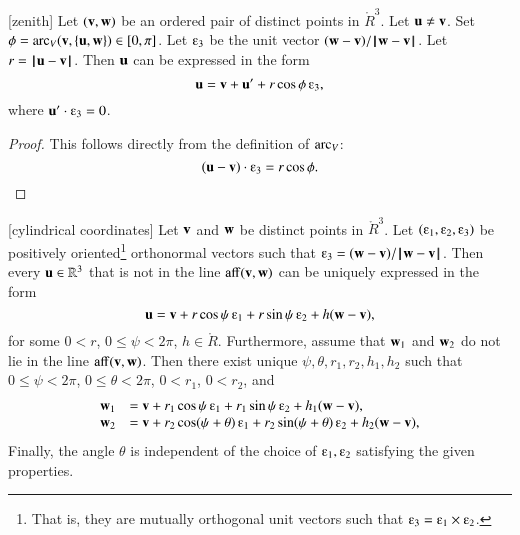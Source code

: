 \begin{lemma}[zenith]
Let $({\mathbf v},{\mathbf w})$ be an ordered pair of distinct points in $\ring{R}^3$.
Let ${\mathbf u}\ne {\mathbf v}$.  Set $\phi = \operatorname{arc}_V({\mathbf v},\{{\mathbf u},{\mathbf w}\})\in[0,\pi]$.
Let $\e_3$ be the unit vector $({\mathbf w}-{\mathbf v})/{\hskip0.1em|\hskip-0.15em|\hskip0.1em}{\mathbf w} - {\mathbf v}{\hskip0.1em|\hskip-0.15em|\hskip0.1em}$.  Let $r = {\hskip0.1em|\hskip-0.15em|\hskip0.1em}{\mathbf u} - {\mathbf v}{\hskip0.1em|\hskip-0.15em|\hskip0.1em}$.
Then ${\mathbf u}$
can be expressed in the form
   $$
   \u = \v + \u' +
   r\cos\phi\, \e_3,
   $$
where $\u'\cdot \e_3 = 0$.
%
%
%
\end{lemma}

\begin{proof} This follows directly from the definition of $\operatorname{arc}_V$:
  $$(\u-\v)\cdot \e_3 = r\cos\phi.$$
\end{proof}



\begin{lemma}[cylindrical coordinates]
Let ${\mathbf v}$ and ${\mathbf w}$ be distinct points in 
$\ring{R}^3$.  Let $(\e_1,\e_2,\e_3)$ be positively oriented\footnote{That is, they are mutually orthogonal unit vectors such that $\e_3 = \e_1 \times \e_2$.} orthonormal
vectors such that $\e_3 = (\w-\v)/\norm{\w}{\v}$.
Then every
${\mathbf u}\in\mathbb{R}^3$ that is not in the line ${\operatorname{aff}}({\mathbf v},{\mathbf w})$
can be uniquely expressed in the form
   $$
   \u = \v + r\cos\psi\, \e_1 + r\sin\psi\, \e_2 + h (\w-\v),
   $$
%
%
for some $0< r$, $0\le \psi < 2\pi$, $h\in\ring{R}$.
Furthermore,
assume that ${\mathbf w}_1$ and ${\mathbf w}_2$ do
not lie in the line ${\operatorname{aff}}({\mathbf v},{\mathbf w})$.
Then there exist unique $\psi,\theta,r_1,r_2,h_1,h_2$
 such
that $0\le\psi<2\pi$, $0\le\theta < 2\pi$, $0 < r_1$, $0 < r_2$, and
  $$
  \begin{array}{lll}
    \w_1 &= \v + r_1\cos\psi\, \e_1 + r_1\sin\psi\, \e_2 + h_1(\w-\v),\\
    \w_2 &= \v + r_2\cos(\psi+\theta)\, \e_1 + r_2\sin(\psi+\theta)\, \e_2 
     + h_2(\w-\v),\\
\end{array}
  $$
Finally, the angle $\theta$ is independent of the choice of $\e_1,\e_2$
satisfying the given properties.
\end{lemma}
%
%
%
%
%
%

